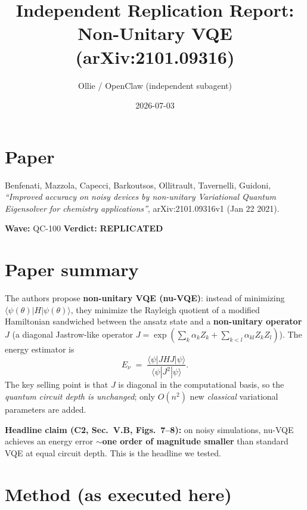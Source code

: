 \documentclass[11pt]{article}
\title{Independent Replication Report: Non-Unitary VQE \\ (arXiv:2101.09316)}
\author{Ollie / OpenClaw (independent subagent)}
\date{2026-07-03}
\begin{document}
\maketitle

\section*{Paper}
Benfenati, Mazzola, Capecci, Barkoutsos, Ollitrault, Tavernelli, Guidoni,
\emph{``Improved accuracy on noisy devices by non-unitary Variational Quantum
Eigensolver for chemistry applications''}, arXiv:2101.09316v1 (Jan 22 2021).

\medskip
\noindent\textbf{Wave:} QC-100 \quad \textbf{Verdict:} \textbf{REPLICATED}

\section{Paper summary}

The authors propose \textbf{non-unitary VQE (nu-VQE)}: instead of minimizing
$\langle \psi(\theta) | H | \psi(\theta) \rangle$, they minimize the Rayleigh
quotient of a modified Hamiltonian sandwiched between the ansatz state and a
\textbf{non-unitary operator} $J$ (a diagonal Jastrow-like operator
$J = \exp(\sum_k \alpha_k Z_k + \sum_{k<l} \alpha_{kl} Z_k Z_l)$). The energy
estimator is
\[
E_{\nu} \;=\; \frac{\langle \psi | J H J | \psi \rangle}{\langle \psi | J^2 | \psi \rangle}.
\]
The key selling point is that $J$ is diagonal in the computational basis, so
the \emph{quantum circuit depth is unchanged}; only $O(n^2)$ new
\emph{classical} variational parameters are added.

\textbf{Headline claim (C2, Sec.~V.B, Figs.~7--8):} on noisy simulations,
nu-VQE achieves an energy error \textbf{$\sim$one order of magnitude smaller}
than standard VQE at equal circuit depth. This is the headline we tested.

\section{Method (as executed here)}
\end{document}
